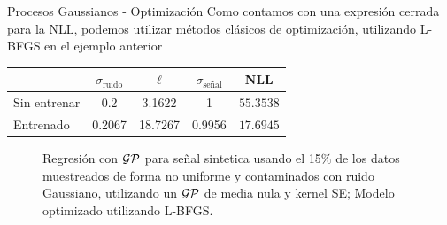 \documentclass[handout, 9pt]{beamer}
\begin{document}
\begin{frame}{Procesos Gaussianos - Optimización}
Como contamos con una expresión cerrada para la NLL, podemos utilizar métodos clásicos de optimización, utilizando L-BFGS en el ejemplo anterior \pause 

    \begin{table}[H]
        \centering
        \begin{tabular}{lcccc}
         & $\sigma_{\text{ruido}}$ & $\ell$ & $\sigma_{\text{señal}}$ & NLL\\ \hline
        Sin entrenar & 0.2 & 3.1622 & 1 & $\mathbf{55.3538}$\\
        Entrenado & 0.2067 & 18.7267 & 0.9956 & $\mathbf{17.6945}$\\
        \end{tabular}
    \end{table} \pause 
        
        
    \begin{figure}[H]
            \centering
            \caption{Regresión con $\mathcal{GP}$ para señal sintetica usando el 15$\%$ de los datos muestreados de forma no uniforme y contaminados con ruido Gaussiano, utilizando un $\mathcal{GP}$ de media nula y kernel SE; Modelo optimizado utilizando L-BFGS.}
    \end{figure}
\end{frame}
\end{document}
